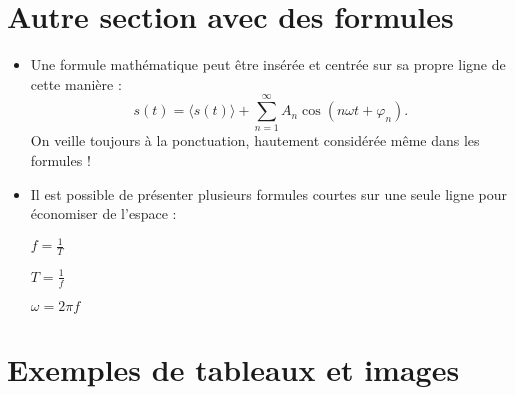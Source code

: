 \documentclass[a4paper,12pt]{article}
\begin{document}
\section{Autre section avec des formules}

\begin{itemize}
    \item Une formule mathématique peut être insérée et centrée sur sa propre ligne de cette manière :
     \[
    s(t) = \langle s(t) \rangle + \sum_{n=1}^{\infty} A_n \cos(n\omega t + \varphi_n).
    \]
    On veille toujours à la ponctuation, hautement considérée même dans les formules !
    
    \item Il est possible de présenter plusieurs formules courtes sur une seule ligne pour économiser de l'espace :
    
    \noindent\begin{minipage}{0.33\linewidth}
        \centering \( \displaystyle f = \frac{1}{T} \)
    \end{minipage}%
    \begin{minipage}{0.33\linewidth}
        \centering \( \displaystyle T = \frac{1}{f} \)
    \end{minipage}%
    \begin{minipage}{0.33\linewidth}
        \centering \( \displaystyle \omega = 2\pi f \)
    \end{minipage}
\end{itemize}


\section{Exemples de tableaux et images}
\end{document}
